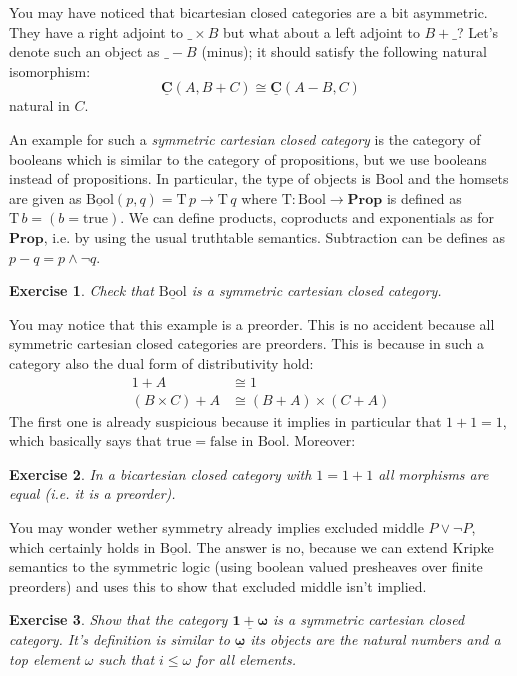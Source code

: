 \documentclass{article}
\newcommand{\Prop}{\mathbf{Prop}}
\newcommand{\Bool}{\mathrm{Bool}}
\newcommand{\true}{\mathrm{true}}
\newcommand{\false}{\mathrm{false}}
\newcommand{\T}{\mathrm{T}}
\newcommand{\cat}[1]{\underline{\mathbf{#1}}}
\newcommand{\homC}[3]{\cat{#1}(#2,#3)}
\newtheorem{exercise}{Exercise}
\begin{document}
You may have noticed that bicartesian closed categories are a bit asymmetric. They have a right adjoint to $\_\times B$ but what about a left adjoint to $B+\_$? Let's denote such an object as $\_- B$ (minus); it should satisfy the following natural isomorphism:
\[ \homC{C}{A}{B+C} \cong \homC{C}{A - B}{C} \]
natural in $C$. 

An example for such a \emph{symmetric cartesian closed category} is the category of booleans which is similar to the category of propositions, but we use booleans instead of propositions. In particular, the type of objects is $\Bool$ and the homsets are given as 
$\homC{\Bool}{p}{q} = \T\,p \to \T\,q$ where $\T : \Bool \to \Prop$ is defined as $\T\,b = (b = \true)$. We can define products, coproducts and exponentials as for $\Prop$, i.e. by using the usual truthtable semantics. Subtraction can be defines as $p-q = p \wedge \neg q$.
\begin{exercise}
  Check that $\cat{\Bool}$ is a symmetric cartesian closed category.
\end{exercise}
You may notice that this example is a preorder. This is no accident because all symmetric cartesian closed categories are preorders. This is because in such a category also the dual form of distributivity hold:
\begin{align*}
  1 +  A & \cong 1 \\
  (B \times C) + A & \cong (B + A) \times (C + A)
\end{align*}
The first one is already suspicious because it implies in particular that $1+1 = 1$, which basically says that $\true = \false$ in $\Bool$. Moreover:
\begin{exercise}
  In a bicartesian closed category with $1 = 1+1$ all morphisms are equal (i.e. it is a preorder). 
\end{exercise}
You may wonder wether symmetry already implies excluded middle $P \vee \neg P$, which certainly holds in $\cat{\Bool}$. The answer is no, because we can extend Kripke semantics to the symmetric logic (using boolean valued presheaves over finite preorders) and uses this to show that excluded middle isn't implied. 

\begin{exercise}
  Show that the category $\cat{1+\omega}$ is a symmetric cartesian closed category. It's definition is similar to $\cat{\omega}$ its objects are the natural numbers and a top element $\omega$ such that $i \leq \omega$ for all elements.
\end{exercise}
\end{document}
